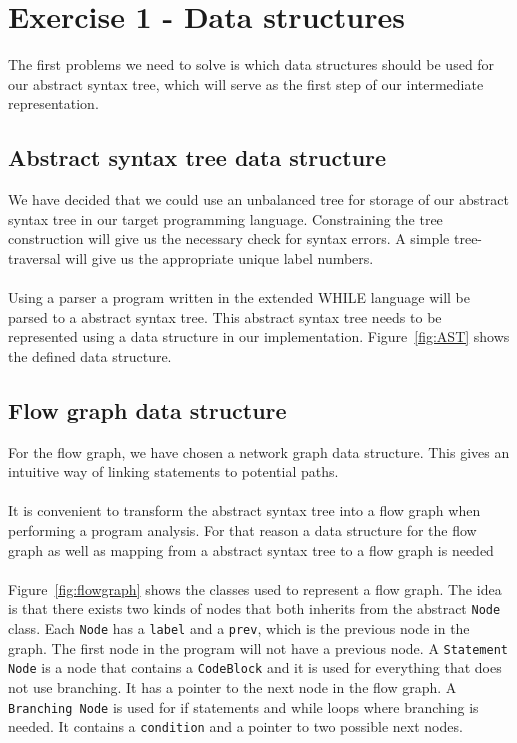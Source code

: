 \section{Exercise 1 - Data structures}
The first problems we need to solve is which data structures should be used for our abstract syntax tree, which will serve as the first step of our intermediate representation.

\subsection{Abstract syntax tree data structure}
We have decided that we could use an unbalanced tree for storage of our abstract syntax tree in our target programming language. Constraining the tree construction will give us the necessary check for syntax errors.
A simple tree-traversal will give us the appropriate unique label numbers.
\\
\\
Using a parser a program written in the extended WHILE language will be parsed to a abstract syntax tree. This abstract syntax tree needs to be represented using a data structure in our implementation. Figure~\ref{fig:AST} shows the defined data structure.

\subsection{Flow graph data structure}
For the flow graph, we have chosen a network graph data structure. This gives an intuitive way of linking statements to potential paths.
\\
\\
It is convenient to transform the abstract syntax tree into a flow graph when performing a program analysis. For that reason a data structure for the flow graph as well as mapping from a abstract syntax tree to a flow graph is needed 
\\
\\
Figure~\ref{fig:flowgraph} shows the classes used to represent a flow graph. The idea is that there exists two kinds of nodes that both inherits from the abstract \texttt{Node} class. Each \texttt{Node} has a \texttt{label} and a \texttt{prev}, which is the previous node in the graph. The first node in the program will not have a previous node. A \texttt{Statement Node} is a node that contains a \texttt{CodeBlock} and it is used for everything that does not use branching. It has a pointer to the next node in the flow graph. A \texttt{Branching Node} is used for if statements and while loops where branching is needed. It contains a \texttt{condition} and a pointer to two possible next nodes.

